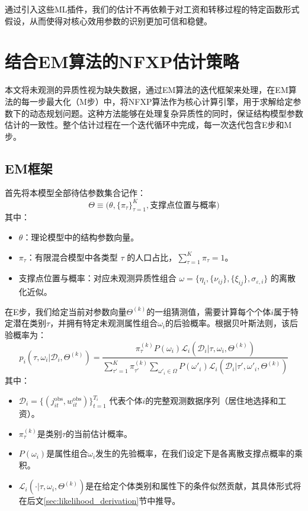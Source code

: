 \documentclass[
  a4paper,
  zihao=-4,
  fontset=mac,
  AutoFakeBold,
  AutoFakeSlant,
  oneside]{ctexbook}
\begin{document}
通过引入这些ML插件，我们的估计不再依赖于对工资和转移过程的特定函数形式假设，从而使得对核心效用参数的识别更加可信和稳健。




\section{结合EM算法的NFXP估计策略}

本文将未观测的异质性视为缺失数据，通过EM算法的迭代框架来处理，在EM算法的每一步最大化（M步）中，将NFXP算法作为核心计算引擎，用于求解给定参数下的动态规划问题。这种方法能够在处理复杂异质性的同时，保证结构模型参数估计的一致性。整个估计过程在一个迭代循环中完成，每一次迭代包含E步和M步。

\subsection{EM框架}

首先将本模型全部待估参数集合记作：
$$
\Theta \equiv \big(\theta, \{\pi_\tau\}_{\tau=1}^K, \text{支撑点位置与概率}\big)
$$
其中：
\begin{itemize}
    \item $\theta$：理论模型中的结构参数向量。
    \item $\pi_\tau$：有限混合模型中各类型 $\tau$ 的人口占比，$\sum_{\tau=1}^K \pi_\tau = 1$。
    \item 支撑点位置与概率：对应未观测异质性组合 $\omega = \{\eta_i, \{\nu_{ij}\}, \{\xi_{ij}\}, \sigma_{\varepsilon,i}\}$ 的离散化近似。
\end{itemize}

在E步，我们给定当前对参数向量$\Theta^{(k)}$的一组猜测值，需要计算每个个体$i$属于特定潜在类别$\tau$，并拥有特定未观测属性组合$\omega_i$的后验概率。根据贝叶斯法则，该后验概率为：
\begin{equation}
    p_{i}(\tau, \omega_i | \mathcal{D}_i, \Theta^{(k)}) = \frac{\pi_\tau^{(k)} P(\omega_i) \mathcal{L}_i(\mathcal{D}_i | \tau, \omega_i, \Theta^{(k)})}{\sum_{\tau'=1}^K \pi_{\tau'}^{(k)} \sum_{\omega'_i \in \Omega} P(\omega'_i) \mathcal{L}_i(\mathcal{D}_i | \tau', \omega'_i, \Theta^{(k)})}
\end{equation}
其中：
\begin{itemize}
    \item $\mathcal{D}_i = \{(j_{it}^{\text{obs}}, w_{it}^{\text{obs}})\}_{t=1}^{T_i}$ 代表个体$i$的完整观测数据序列（居住地选择和工资）。
    \item $\pi_\tau^{(k)}$是类别$\tau$的当前估计概率。
    \item $P(\omega_i)$是属性组合$\omega_i$发生的先验概率，在我们设定下是各离散支撑点概率的乘积。
    \item $\mathcal{L}_i(\cdot | \tau, \omega_i, \Theta^{(k)})$是在给定个体类别和属性下的条件似然贡献，其具体形式将在后文\ref{sec:likelihood_derivation}节中推导。
\end{itemize}
\end{document}
